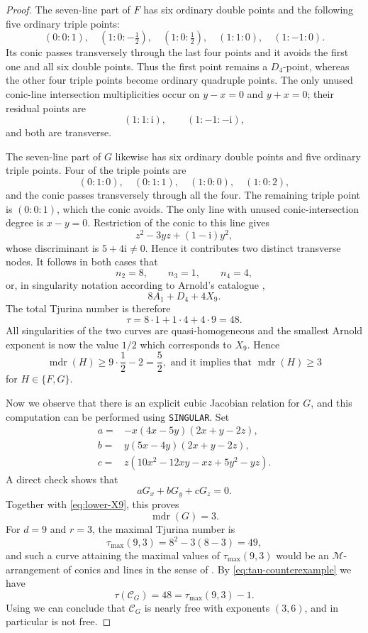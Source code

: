 \documentclass[11pt]{article}
\theoremstyle{remark}
\newcommand{\mdr}{\operatorname{mdr}}
\newcommand{\ii}{\mathrm i}
\begin{document}
\begin{proof}
The seven-line part of $F$ has six ordinary double points and the following five ordinary triple points:
\[
 (0:0:1),\quad
 (1:0:-\tfrac12),\quad
 (1:0:\tfrac12),\quad
 (1:1:0),\quad
 (1:-1:0).
\]
Its conic passes transversely through the last four points and it avoids the first one and all six double points. Thus the first point remains a
$D_4$-point, whereas the other four triple points become ordinary quadruple
points.  The only unused conic-line intersection multiplicities occur on
$y-x=0$ and $y+x=0$; their residual points are
\[
 (1:1:\ii),\qquad (1:-1:-\ii),
\]
and both are transverse.

The seven-line part of $G$ likewise has six ordinary double points and five ordinary triple points. Four of the triple points are
\[
 (0:1:0),\quad (0:1:1),\quad (1:0:0),\quad (1:0:2),
\]
and the conic passes transversely through all the four. The remaining triple point is $(0:0:1)$, which the conic avoids. The only line with unused conic-intersection degree is $x-y=0$.  Restriction of the conic to this line gives
\[
 z^2-3yz+(1-\ii)y^2,
\]
whose discriminant is $5+4\ii\ne0$.  Hence it contributes two distinct
transverse nodes. It follows in both cases that
\[
 n_2=8,\qquad n_3=1,\qquad n_4=4,
\]
or, in singularity notation according to Arnold's catalogue \cite{arnold},
\[
 8A_1+D_4+4X_9.
\]
The total Tjurina number is therefore
\begin{equation}\label{eq:tau-counterexample}
 \tau=8\cdot1+1\cdot4+4\cdot9=48.
\end{equation}
All singularities of the two curves are quasi-homogeneous and the smallest Arnold exponent is now the value $1/2$ which corresponds to $X_9$. Hence
\begin{equation}\label{eq:lower-X9}
 \mdr(H)\ge 9\cdot\frac12-2=\frac52,
\text{ and it implies that }\mdr(H)\ge3
\end{equation}
for $H \in \{F,G\}$.

Now we observe that there is an explicit cubic Jacobian relation for $G$, and this computation can be performed using \texttt{SINGULAR}. Set
\begin{align*}
 a={}&-x(4x-5y)(2x+y-2z),\\
 b={}& y(5x-4y)(2x+y-2z),\\
 c={}& z(10x^2-12xy-xz+5y^2-yz).
\end{align*}
A direct check shows that
\[
 aG_x+bG_y+cG_z=0.
\]
Together with \eqref{eq:lower-X9}, this proves
\[
 \mdr(G)=3.
\]
For $d=9$ and $r=3$, the maximal Tjurina number is
\[
 \tau_{\max}(9,3)=8^2-3(8-3)=49,
\]
and such a curve attaining the maximal values of $\tau_{\max}(9,3)$ would be an $\mathscr{M}$-arrangement of conics and lines in the sense of \cite{MJ}. By \eqref{eq:tau-counterexample} we have
\[
 \tau(\mathcal C_G)=48=\tau_{\max}(9,3)-1.
\]
Using \cite{DimcaMaxTau} we can conclude that $\mathcal C_G$ is nearly free with exponents $(3,6)$, and in particular is not free.


\end{proof}
\end{document}

